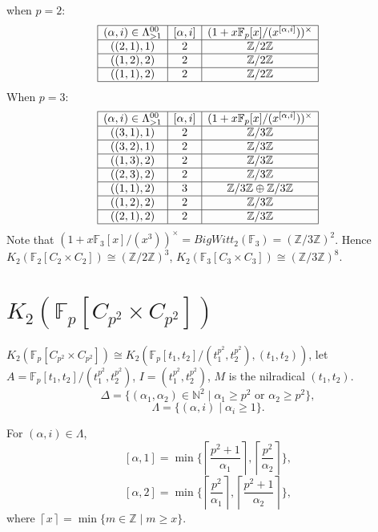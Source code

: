when $p=2$:
	\[\begin{array}{|c|c|c|c|}
	\hline
	(\alpha,i)\in \Lambda^{00}_{>1} & [\alpha,i] & (1+x \mathbb{F}_p[x]/(x^{[\alpha,i]}))^{\times} \\
	\hline
	((2,1),1)  & 2 & \mathbb{Z}/2 \mathbb{Z}\\
	\hline
	((1,2),2)  & 2& \mathbb{Z}/2 \mathbb{Z} \\
	\hline
	((1,1),2)  & 2& \mathbb{Z}/2 \mathbb{Z} \\
	\hline
		\end{array}\]
When $p=3$:
	\[\begin{array}{|c|c|c|c|}
	\hline
	(\alpha,i)\in \Lambda^{00}_{>1} & [\alpha,i] & (1+x \mathbb{F}_p[x]/(x^{[\alpha,i]}))^{\times} \\
	\hline
	((3,1),1)  & 2 & \mathbb{Z}/3 \mathbb{Z}\\
	\hline
	((3,2),1)  & 2& \mathbb{Z}/3 \mathbb{Z} \\
	\hline
	((1,3),2)  & 2& \mathbb{Z}/3 \mathbb{Z} \\
	\hline
	((2,3),2)  & 2& \mathbb{Z}/3 \mathbb{Z} \\
	\hline
	((1,1),2)  & 3& \mathbb{Z}/3 \mathbb{Z}\oplus \mathbb{Z}/3 \mathbb{Z} \\
	\hline
	((1,2),2)  & 2& \mathbb{Z}/3 \mathbb{Z} \\
	\hline
	((2,1),2)  & 2& \mathbb{Z}/3 \mathbb{Z} \\
	\hline
	\end{array}\]
	Note that  $(1+x \mathbb{F}_3[x]/(x^3))^{\times}=BigWitt_2(\mathbb{F}_3)=(\mathbb{Z}/3 \mathbb{Z})^2$. 
	Hence $K_2(\mathbb{F}_{2}[C_2\times C_2])\cong (\mathbb{Z}/2 \mathbb{Z})^3 $, $K_2(\mathbb{F}_{3}[C_3\times C_3])\cong (\mathbb{Z}/3 \mathbb{Z})^8$.

\section{$K_2(\mathbb{F}_{p}[C_{p^2}\times C_{p^2}])$}
$K_2(\mathbb{F}_{p}[C_{p^2}\times C_{p^2}])\cong K_2(\mathbb{F}_{p}[t_1,t_2]/(t_1^{p^2},t_2^{p^2}),(t_1,t_2))$, let $A=\mathbb{F}_{p}[t_1,t_2]/(t_1^{p^2},t_2^{p^2})$, $I=(t_1^{p^2},t_2^{p^2})$, $M$ is the nilradical $(t_1,t_2)$.
\[\Delta =\{(\alpha_1,\alpha_2)\in\mathbb{N}^2\mid  \alpha_1 \geq p^2 \text{ or } \alpha_2 \geq p^2\},\] 
	\[\Lambda =\{(\alpha,i)\mid \alpha_i \geq 1\}.\]

	For $(\alpha,i)\in \Lambda$, 
	\[ [\alpha,1]=\min\{\left \lceil \frac{p^2+1}{\alpha_1} \right \rceil, \left \lceil \frac{p^2}{\alpha_2} \right \rceil \}, \]
	\[ [\alpha,2]=\min\{\left \lceil \frac{p^2}{\alpha_1} \right \rceil, \left \lceil \frac{p^2+1}{\alpha_2} \right \rceil \},\]
	where $\left \lceil x \right \rceil=\min \{m\in \mathbb{Z}\mid m\geq x\}$.

